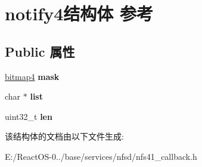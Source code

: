 \hypertarget{structnotify4}{}\section{notify4结构体 参考}
\label{structnotify4}
\subsection*{Public 属性}
\begin{DoxyCompactItemize}
\item 
\mbox{\label{structnotify4_abf83475b717c022123ccfe6c54c46e3e}} 
\hyperlink{struct____bitmap4}{bitmap4} {\bfseries mask}
\item 
\mbox{\label{structnotify4_a15568c79ed2d8c78b7e0b4d35204e238}} 
char $\ast$ {\bfseries list}
\item 
\mbox{\label{structnotify4_a8876f5a9f93c367442825d9f70841504}} 
uint32\+\_\+t {\bfseries len}
\end{DoxyCompactItemize}


该结构体的文档由以下文件生成\+:\begin{DoxyCompactItemize}
\item 
E\+:/\+React\+O\+S-\/0../base/services/nfsd/nfs41\+\_\+callback.\+h\end{DoxyCompactItemize}
